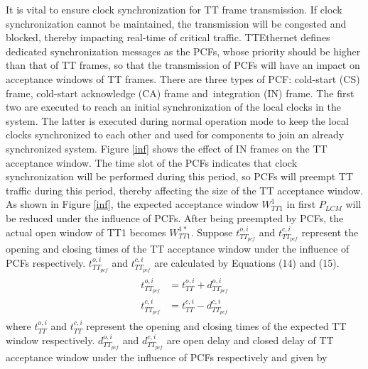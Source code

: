 \documentclass[electronics,article,accept,moreauthors,pdftex]{Definitions/mdpi}
\begin{document}
It is vital to ensure clock synchronization for TT frame transmission. If clock synchronization cannot be maintained, the transmission will be congested and blocked, thereby impacting real-time of critical traffic.
TTEthernet defines dedicated synchronization messages as the PCFs, whose priority should be higher than that of TT frames, so that the transmission of PCFs will have an impact on acceptance windows of TT frames. There are three types of PCF: cold-start (CS) frame, cold-start acknowledge (CA) frame and~integration (IN) frame. The first two are executed to reach  an initial synchronization of the local clocks in  the system. The latter is executed during normal operation mode to keep the local clocks synchronized to each other and used for components to join an already synchronized system. {Figure} \ref{inf} shows the effect of IN frames on the TT acceptance window. The time slot of the PCFs indicates that clock synchronization will be performed during this period, so PCFs will preempt TT traffic during this period, thereby affecting the size of the TT acceptance window. As shown in {Figure} \ref{inf}, the expected acceptance window $W^1_{TT1}$ in first $P_{LCM}$ will be reduced under the influence of PCFs. After being preempted by PCFs, the actual open window of TT1 becomes $W^{1*}_{TT1}$. Suppose $t^{o,i}_{TT_{pcf}}$ and $t^{c,i}_{TT_{pcf}}$  represent the opening and closing times of the TT acceptance window under the influence of PCFs respectively. $t^{o,i}_{TT_{pcf}}$ and $t^{c,i}_{TT_{pcf}}$ are calculated by Equations (14) and (15).
\begin{gather}
\begin{align}
	t^{o,i}_{TT_{pcf}} &= t^{o,i}_{TT} + d^{o,i}_{TT_{pcf}}\\
	t^{c,i}_{TT_{pcf}} &= t^{c,i}_{TT} - d^{c,i}_{TT_{pcf}}
\end{align}
\end{gather}
where $t^{o,i}_{TT}$ and $t^{c,i}_{TT}$ represent the opening and closing times of the expected TT window respectively. $d^{o,i}_{TT_{pcf}}$ and $d^{c,i}_{TT_{pcf}}$ are open delay and closed delay of TT acceptance window under the influence of PCFs respectively and given by
\end{document}

